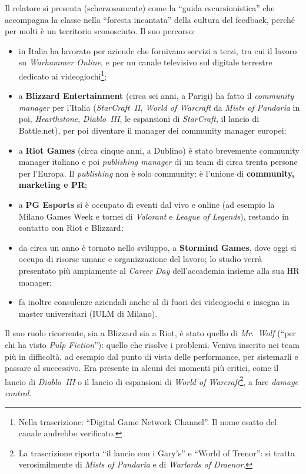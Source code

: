 Il relatore si presenta (scherzosamente) come la ``guida escursionistica''
che accompagna la classe nella ``foresta incantata'' della cultura del
feedback, perché per molti è un territorio sconosciuto. Il suo percorso:
\begin{itemize}
  \item in Italia ha lavorato per aziende che fornivano servizi a terzi, tra
        cui il lavoro su \emph{Warhammer Online}, e per un canale televisivo
        sul digitale terrestre dedicato ai videogiochi\footnote{Nella
        trascrizione: ``Digital Game Network Channel''. Il nome esatto del
        canale andrebbe verificato.};
  \item a \textbf{Blizzard Entertainment} (circa sei anni, a Parigi) ha fatto
        il \emph{community manager} per l'Italia (\emph{StarCraft~II},
        \emph{World of Warcraft} da \emph{Mists of Pandaria} in poi,
        \emph{Hearthstone}, \emph{Diablo~III}, le espansioni di
        \emph{StarCraft}, il lancio di Battle.net), per poi diventare il
        manager dei community manager europei;
  \item a \textbf{Riot Games} (circa cinque anni, a Dublino) è stato
        brevemente community manager italiano e poi \emph{publishing
        manager} di un team di circa trenta persone per l'Europa. Il
        \emph{publishing} non è solo community: è l'unione di
        \textbf{community, marketing e PR};
  \item a \textbf{PG Esports} si è occupato di eventi dal vivo e online
        (ad esempio la Milano Games Week e tornei di \emph{Valorant} e
        \emph{League of Legends}), restando in contatto con Riot e Blizzard;
  \item da circa un anno è tornato nello sviluppo, a \textbf{Stormind
        Games}, dove oggi si occupa di risorse umane e organizzazione del
        lavoro; lo studio verrà presentato più ampiamente al \emph{Career
        Day} dell'accademia insieme alla sua HR manager;
  \item fa inoltre consulenze aziendali anche al di fuori dei videogiochi e
        insegna in master universitari (IULM di Milano).
\end{itemize}

Il suo ruolo ricorrente, sia a Blizzard sia a Riot, è stato quello di
\emph{Mr.~Wolf} (``per chi ha visto \emph{Pulp Fiction}''): quello che
risolve i problemi. Veniva inserito nei team più in difficoltà, ad esempio
dal punto di vista delle performance, per sistemarli e passare al successivo.
Era presente in alcuni dei momenti più critici, come il lancio di
\emph{Diablo~III} o il lancio di espansioni di \emph{World of
Warcraft}\footnote{La trascrizione riporta ``il lancio con i Gary's'' e
``World of Trenor'': si tratta verosimilmente di \emph{Mists of Pandaria} e
di \emph{Warlords of Draenor}.}, a fare \emph{damage control}.

